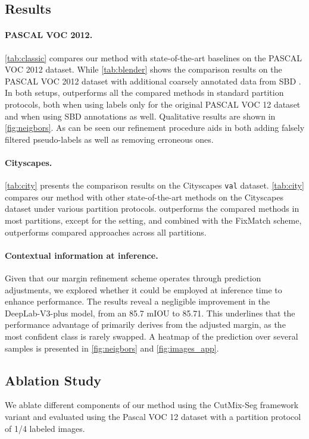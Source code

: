 \documentclass{article}
\renewcommand{\cite}[1]{\citep{#1}}
\begin{document}
\subsection{Results}\label{sec:compare}

\paragraph{PASCAL VOC 2012.}
\cref{tab:classic} compares our method with state-of-the-art baselines on the PASCAL VOC 2012 dataset. While \cref{tab:blender} shows the comparison results on the PASCAL VOC 2012 dataset with additional coarsely annotated data from SBD \cite{sbd}.
In both setups, \methodname{} outperforms all the compared methods in standard partition protocols, both when using labels only for the original PASCAL VOC 12 dataset and when using SBD annotations as well. Qualitative results are shown in \cref{fig:neigbors}. 
As can be seen our refinement procedure aids in both adding falsely filtered pseudo-labels as well as removing erroneous ones. 

\paragraph{Cityscapes.} \cref{tab:city} presents the comparison results on the Cityscapes \texttt{val} dataset. 
\cref{tab:city} compares our method with other state-of-the-art methods on the Cityscapes \cite{cityscapes} dataset under various partition protocols.
\methodname{} outperforms the compared methods in most partitions, except for the  setting, and combined with the FixMatch scheme, \methodname{} outperforms compared approaches across all partitions.

\paragraph{Contextual information at inference.}
Given that our margin refinement scheme operates through prediction adjustments, we explored whether it could be employed at inference time to enhance performance. The results reveal a negligible improvement in the DeepLab-V3-plus model, from an 85.7 mIOU to 85.71. This underlines that the performance advantage of \methodname{} primarily derives from the adjusted margin, as the most confident class is rarely swapped. A heatmap of the prediction over several samples is presented in \cref{fig:neigbors} and \cref{fig:images_app}.

\subsection{Ablation Study}\label{sec:ablation}
We ablate different components of our method using the CutMix-Seg framework variant and evaluated using the Pascal VOC 12 dataset with a partition protocol of 1/4 labeled images.
\end{document}
